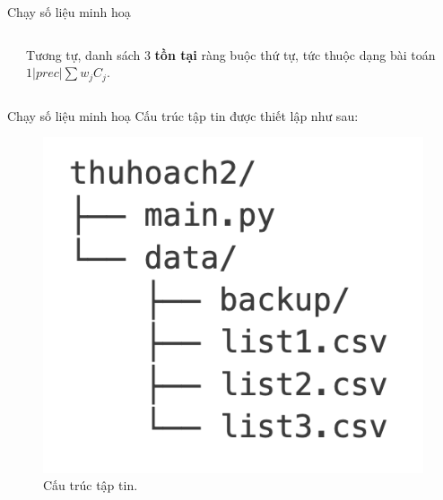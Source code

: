 \documentclass[10pt]{beamer}
\begin{document}
\begin{frame}{Chạy số liệu minh hoạ}
\begin{columns}
\begin{column}{0.5\textwidth}
    \begin{table}[ht]
        \centering
        \caption{Danh sách 3.}
        \label{tab:further_extended_job_table}
    \end{table}
\end{column}
\begin{column}{0.5\textwidth}
Tương tự, danh sách 3 \textbf{tồn tại} ràng buộc thứ tự, tức thuộc dạng bài toán $1|prec|\sum w_j C_j$.
\end{column}
\end{columns}
\end{frame}

\begin{frame}{Chạy số liệu minh hoạ}
Cấu trúc tập tin được thiết lập như sau:
\medskip
\begin{figure}[h]
\centering
\includegraphics[width=0.4\linewidth]{path.png}
\caption{Cấu trúc tập tin.}
\end{figure}
\end{frame}
\end{document}
